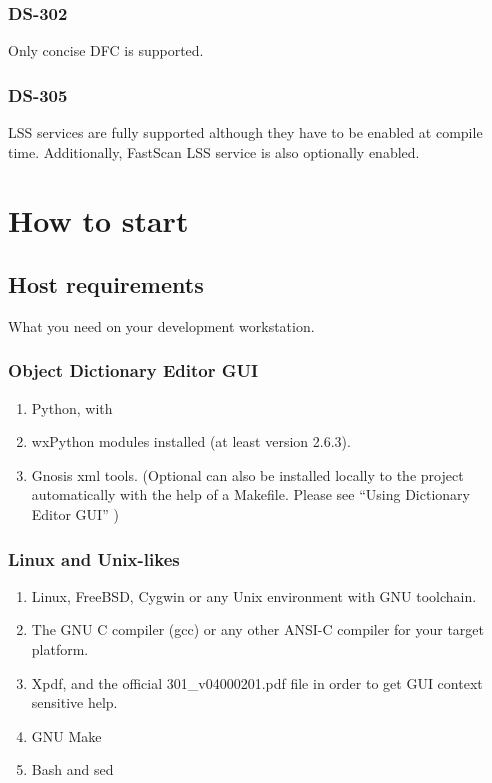 \documentclass[12pt,english,a4paper]{book}
\begin{document}
\subsubsection{DS-302}

Only concise DFC is supported.

\subsubsection{DS-305}

LSS services are fully supported although they have to be enabled at compile time. Additionally, FastScan LSS service is also optionally enabled. 

\section{How to start}

\subsection{Host requirements}

What you need on your development workstation.

\subsubsection{Object Dictionary Editor GUI}

\begin{enumerate}
\item Python, with 
\item wxPython modules installed (at least version 2.6.3).
\item Gnosis xml tools. (Optional can also be installed locally to the project
automatically with the help of a Makefile. Please see {}``Using Dictionary
Editor GUI'' ) 
\end{enumerate}

\subsubsection{Linux and Unix-likes}

\begin{enumerate}
\item Linux, FreeBSD, Cygwin or any Unix environment with GNU toolchain. 
\item The GNU C compiler (gcc) or any other ANSI-C compiler for your target
platform. 
\item Xpdf, and the official 301\_v04000201.pdf file in order to get GUI
context sensitive help. 
\item GNU Make 
\item Bash and sed 
\end{enumerate}
\end{document}
